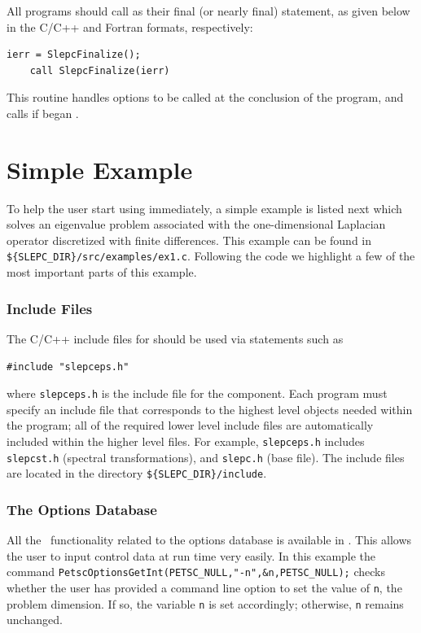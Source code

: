 All \slepc programs should call 
as their final (or nearly final) statement, as given below in the C/C++
and Fortran formats, respectively:
	\begin{Verbatim}[fontsize=\small]
	ierr = SlepcFinalize();
	call SlepcFinalize(ierr)
	\end{Verbatim}
This routine handles options to be called at the conclusion of
the program, and calls 
if 
began \petsc.


\section{Simple \slepc Example}
\label{sec:simpleex}

To help the user start using \slepc immediately, a simple example is listed next which solves an eigenvalue problem associated with the
one-dimensional Laplacian operator discretized with finite differences.  This
example can be found in \Verb!${SLEPC_DIR}/src/examples/ex1.c!.
Following the code we highlight a few of the most important parts of this example.  


\subsubsection*{Include Files}

The C/C++ include files for \slepc should be used via statements such as
	\begin{Verbatim}[fontsize=\small]
	#include "slepceps.h"
	\end{Verbatim}
where \Verb!slepceps.h! is the include file for the  component.
Each \slepc program must specify an
include file that corresponds to the highest level \slepc objects
needed within the program; all of the required lower level include
files are automatically included within the higher level files. 
For
example, \Verb!slepceps.h! includes \Verb!slepcst.h! (spectral transformations),
and \Verb!slepc.h! (base \slepc file).  
The \slepc include files are located in the directory 
\Verb!${SLEPC_DIR}/include!.

\subsubsection*{The Options Database}

All the \petsc\ functionality related to the options database is available in \slepc. This allows the user to input control data
at run time very easily. In this example the command
\Verb!PetscOptionsGetInt(PETSC_NULL,"-n",&n,PETSC_NULL);! checks whether the user has
provided a command line option to set the value of \Verb!n!, the
problem dimension.  If so, the variable \Verb!n! is set accordingly;
otherwise, \Verb!n! remains unchanged.

